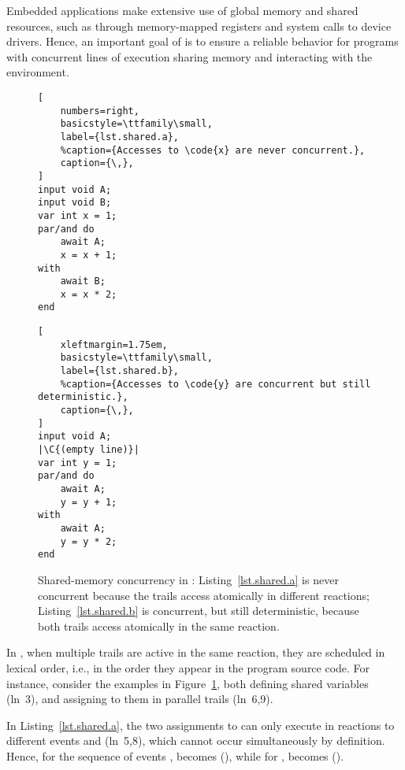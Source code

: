 Embedded applications make extensive use of global memory and shared resources,
such as through memory-mapped registers and system calls to device drivers.
Hence, an important goal of \CEU is to ensure a reliable behavior for programs
with concurrent lines of execution sharing memory and interacting with the
environment.

\begingroup
\begin{figure}[b!]
\begin{minipage}[t]{0.45\linewidth}
\begin{lstlisting}[
    numbers=right,
    basicstyle=\ttfamily\small,
    label={lst.shared.a},
    %caption={Accesses to \code{x} are never concurrent.},
    caption={\,},
]
input void A;
input void B;
var int x = 1;
par/and do
    await A;
    x = x + 1;
with
    await B;
    x = x * 2;
end
\end{lstlisting}
\end{minipage}%
%
\begin{minipage}[t]{0.53\linewidth}
\begin{lstlisting}[
    xleftmargin=1.75em,
    basicstyle=\ttfamily\small,
    label={lst.shared.b},
    %caption={Accesses to \code{y} are concurrent but still deterministic.},
    caption={\,},
]
input void A;
|\C{(empty line)}|
var int y = 1;
par/and do
    await A;
    y = y + 1;
with
    await A;
    y = y * 2;
end
\end{lstlisting}
\end{minipage}%
\caption{Shared-memory concurrency in \CEU:
Listing~\ref{lst.shared.a} is never concurrent because the trails access
 atomically in different reactions;
Listing~\ref{lst.shared.b} is concurrent, but still deterministic, because both
trails access  atomically in the same reaction.}
\label{lst.shared}
\end{figure}
\endgroup

In \CEU, when multiple trails are active in the same reaction, they are
scheduled in lexical order, i.e., in the order they appear in the program
source code.
%
For instance, consider the examples in Figure~\ref{lst.shared}, both
defining shared variables (ln~3), and assigning to them in parallel trails
(ln~6,9).

In Listing~\ref{lst.shared.a}, the two assignments to  can only execute
in reactions to different events  and  (ln~5,8), which cannot
occur simultaneously by definition.
Hence, for the sequence of events ,  becomes 
(), while for ,  becomes 
().

